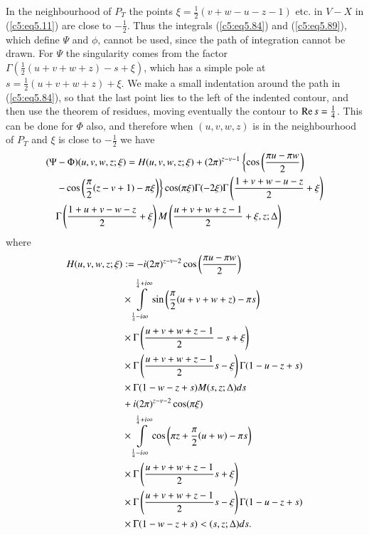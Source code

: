 In the neighbourhood of $P_T$ the points $\xi =\frac{1}{2}
(v+w-u-z-1)$ etc. in $V-X$ in (\ref{c5:eq5.11}) are close to
$-\frac{1}{2}$. Thus the integrals (\ref{c5:eq5.84}) and
(\ref{c5:eq5.89}), which define $\Psi$ and $\phi$, cannot be used,
since the path of integration cannot be drawn. For $\Psi$ the
singularity comes from the factor $\Gamma (\frac{1}{2} (u+v+w+z)- s+
\xi)$, which has a simple pole at $s = \frac{1}{2} (u+v+w+z) +
\xi$. We make a small indentation around the path in
(\ref{c5:eq5.84}), so that the last point lies to the left of the
indented contour, and then use the theorem of residues, moving
eventually the contour to $\operatorname{Re} s =\frac{1}{4}$. This can be done for
$\Phi$ also, and therefore when $(u,v,w,z)$ is in the neighbourhood of
$P_T$ and $\xi$ is close to $-\frac{1}{2}$ we have  
\begin{align}
& (\Psi -\Phi) (u,v,w,z;\xi) = H (u,v,w,z;\xi) +
(2\pi)^{z-v-1} \left\{\cos \left(\frac{\pi u - \pi w}{2} \right)
  \right.\notag\\ 
& \quad \left.  - \cos \left(\frac{\pi}{2} (z-v+1) - \pi \xi \right)
  \right\} \cos (\pi \xi)  
 \Gamma (-2\xi) \Gamma \left(\frac{1+v+w-u-z}{2} + \xi \right)\notag\\
& \quad  \Gamma \left(\frac{1+u+v-w-z}{2} + \xi \right) M \left(
 \frac{u+v+w+z-1}{2}  + \xi, z;\Delta\right)\label{c5:eq5.114}
\end{align}
where
\begin{align}
H (u,v,w,z;\xi) &:= 
-i (2\pi)^{z-v-2} \cos \left( \frac{\pi u - \pi w}{2}\right)\notag\\
&\times\int\limits^{\frac{1}{4} + i \infty}_{\frac{1}{4} - i \infty} \sin
\left(\frac{\pi}{2} (u+v+w+z) -\pi s\right)\notag\\ 
&\times\Gamma\left(\frac{u+v+w+z-1}{2} - s+\xi \right)\notag\\
&\times\Gamma \left(\frac{u+v+w+z-1}{2} s- \xi \right) \Gamma
(1-u-z+s)\notag\\ 
&\times\Gamma (1-w-z+s) M (s,z;\Delta) ds\notag \\ 
&+ i (2 \pi)^{z-v-2} \cos (\pi \xi)\notag\\ 
&\times\int\limits^{\frac{1}{4} + i
\infty}_{\frac{1}{4}- i \infty} \cos \left(\pi z + \frac{\pi}{2}
(u+w) - \pi s \right)\notag\\ 
&\times\Gamma \left(\frac{u+v+w+z-1}{2} s+ \xi \right)\notag\\ 
&\times\Gamma \left( \frac{u+v+w+z-1}{2} s - \xi \right) \Gamma
(1-u-z+s)\notag\\ 
&\times\Gamma (1-w-z+s) < (s,z;\Delta) ds.\label{c5:eq5.115}  
\end{align}

